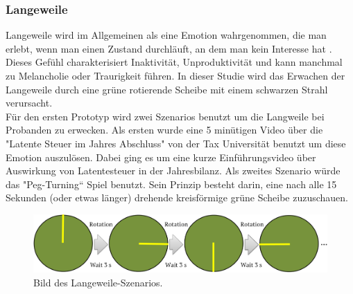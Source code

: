 \subsubsection{Langeweile} \label{langeweile-1}


Langeweile wird im Allgemeinen als eine Emotion wahrgenommen, die man erlebt, wenn man einen Zustand durchl{\"a}uft, an dem man kein Interesse hat \cite{vodanovich_2003}. 
Dieses Gef{\"u}hl charakterisiert Inaktivit{\"a}t, Unproduktivit{\"a}t und kann manchmal zu Melancholie oder Traurigkeit f{\"u}hren.
In dieser Studie wird das Erwachen der Langeweile durch eine gr{\"u}ne rotierende Scheibe mit einem schwarzen Strahl verursacht. \\

F{\"u}r den ersten Prototyp wird zwei Szenarios benutzt um die Langweile bei Probanden zu erwecken.
Als ersten wurde eine 5 min{\"u}tigen Video {\"u}ber die "Latente Steuer im Jahres Abschluss" von der Tax Universit{\"a}t benutzt um diese Emotion auszul{\"o}sen. Dabei ging es um eine kurze Einf{\"u}hrungsvideo {\"u}ber Auswirkung von Latentesteuer in der Jahresbilanz. 
Als zweites Szenario w{\"u}rde das "Peg-Turning“ Spiel benutzt. Sein Prinzip besteht darin, eine nach alle 15 Sekunden (oder etwas l{\"a}nger) drehende kreisf{\"o}rmige gr{\"u}ne Scheibe zuzuschauen.


\begin{figure}[H] \centering
\includegraphics[width=\textwidth]{Images/boredom_game2.png} 
\vspace{-0.3cm} 
\caption{Bild des Langeweile-Szenarios.}
\label{fig-glueck} 
\end{figure}

